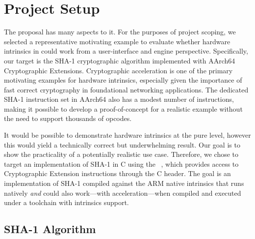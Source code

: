 \section{Project Setup}
\label{sec:setup}

The  proposal has many aspects to it. For the purposes
of project scoping, we selected a representative motivating example to evaluate
whether hardware intrinsics in \wasm could work from a user-interface and engine
perspective. Specifically, our target is the SHA-1 cryptographic algorithm
implemented with AArch64 Cryptographic Extensions. Cryptographic acceleration is
one of the primary motivating examples for hardware intrinsics, especially given
the importance of fast correct cryptography in foundational networking
applications. The dedicated SHA-1 instruction set in AArch64 also has a modest
number of instructions, making it possible to develop a proof-of-concept for a
realistic example without the need to support thousands of opcodes.

It would be possible to demonstrate hardware intrinsics at the pure \wasm level,
however this would yield a technically correct but underwhelming result. Our
goal is to show the practicality of a potentially realistic use case.
Therefore, we chose to target an implementation of SHA-1 in C using the
~\cite{acle}, which provides access to Cryptographic Extension
instructions through the  C header. The goal is an
implementation of SHA-1 compiled against the ARM native intrinsics that runs
natively \emph{and} could also work---with acceleration---when compiled and
executed under a \wasm toolchain with intrinsics support.

\subsection{SHA-1 Algorithm}

